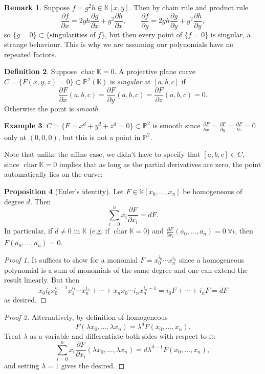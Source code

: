\documentclass{article}
\newcommand{\K}{\mathbb{K}}
\newcommand{\p}{\mathbb{P}}
\newcommand{\Char}{\operatorname{char}}
\theoremstyle{definition}
\newtheorem{defn}{Definition}[subsection]
\newtheorem{prop}[defn]{Proposition}
\newtheorem{example}[defn]{Example}
\newtheorem{remark}[defn]{Remark}
\begin{document}
\begin{remark}
Suppose $f=g^2h\in\K[x,y]$. Then by chain rule and product rule
\[
\frac{\partial f}{\partial x}=2gh\frac{\partial g}{\partial x}+g^2\frac{\partial h}{\partial x}, \qquad \frac{\partial f}{\partial y}=2gh\frac{\partial g}{\partial y}+g^2\frac{\partial h}{\partial y},
\]
so $\{g=0\}\subset\{\text{singularities of }f\}$, but then every point of $\{f=0\}$ is singular, a strange behaviour. This is why we are assuming our polynomials have no repeated factors.
\end{remark}

\begin{defn}
Suppose $\Char\K=0$. A projective plane curve $C=\{F(x,y,z)=0\}\subset\p^2(\K)$ is \textit{singular} at $[a,b,c]$ if
\[
\frac{\partial F}{\partial x}(a,b,c)=\frac{\partial F}{\partial y}(a,b,c)=\frac{\partial F}{\partial z}(a,b,c)=0.
\]
Otherwise the point is \textit{smooth}.
\end{defn}

\begin{example}
$C=\{F=x^d+y^d+z^d=0\}\subset\p^2$ is smooth since $\frac{\partial F}{\partial x}=\frac{\partial F}{\partial y}=\frac{\partial F}{\partial z}=0$ only at $(0,0,0)$, but this is not a point in $\p^2$.
\end{example}

Note that unlike the affine case, we didn't have to specify that $[a,b,c]\in C$, since $\Char\K=0$ implies that as long as the partial derivatives are zero, the point automatically lies on the curve:
\begin{prop}[Euler's identity]
\label{prop:eulersid}
Let $F\in\K[x_0,\ldots,x_n]$ be homogeneous of degree $d$. Then
\[
\sum_{i=0}^n x_i \frac{\partial F}{\partial x_i}=dF.
\]
In particular, if $d\neq 0$ in $\K$ (e.g. if $\Char\K=0$) and $\frac{\partial F}{\partial x_i}(a_0,\ldots,a_n)=0 \ \forall i$, then $F(a_0,\ldots,a_n)=0$.
\end{prop}
\begin{proof}[Proof 1]
It suffices to show for a monomial $F=x_0^{i_0}\cdots x_n^{i_n}$ since a homogeneous polynomial is a sum of monomials of the same degree and one can extend the result linearly. But then
\[
x_0 i_0 x_0^{i_0-1}x_1^{i_1}\cdots x_n^{i_n}+\cdots+x_nx_0\cdots i_nx_n^{i_n-1}=i_0F+\cdots+i_nF=dF
\]
as desired.
\end{proof}
\begin{proof}[Proof 2]
Alternatively, by definition of homogeneous
\[
F(\lambda x_0,\ldots,\lambda x_n)=\lambda^d F(x_0,\ldots,x_n).
\]
Treat $\lambda$ as a variable and differentiate both sides with respect to it:
\[
\sum_{i=0}^n x_i\frac{\partial F}{\partial x_i}(\lambda x_0,\ldots,\lambda x_n)=d\lambda^{d-1}F(x_0,\ldots,x_n),
\]
and setting $\lambda=1$ gives the desired.
\end{proof}
\end{document}
